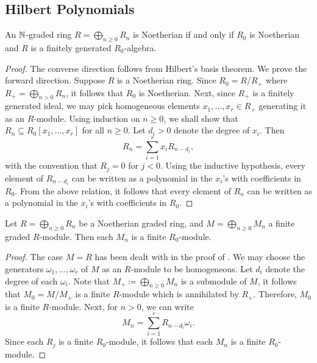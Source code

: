 \subsection{Hilbert Polynomials}

\begin{theorem}
    An $\mathbb{N}$-graded ring $\displaystyle R = \bigoplus_{n\ge 0} R_n$ is Noetherian if and only if $R_0$ is Noetherian and $R$ is a finitely generated $R_0$-algebra.
\end{theorem}
\begin{proof}
    The converse direction follows from Hilbert's basis theorem. We prove the forward direction. Suppose $R$ is a Noetherian ring. Since $R_0 = R/R_+$ where $\displaystyle R_+ = \bigoplus_{n > 0} R_n$, it follows that $R_0$ is Noetherian. Next, since $R_+$ is a finitely generated ideal, we may pick homogeneous elements $x_1,\dots,x_r\in R_+$ generating it as an $R$-module. Using induction on $n\ge 0$, we shall show that $R_n\subseteq R_0[x_1,\dots,x_r]$ for all $n\ge 0$. Let $d_i > 0$ denote the degree of $x_i$. Then
    \begin{equation*}
        R_n = \sum_{i = 1}^r x_i R_{n - d_i},
    \end{equation*}
    with the convention that $R_j = 0$ for $j < 0$. Using the inductive hypothesis, every element of $R_{n - d_i}$ can be written as a polynomial in the $x_i$'s with coefficients in $R_0$. From the above relation, it follows that every element of $R_n$ can be written as a polynomial in the $x_i$'s with coefficients in $R_0$.
\end{proof}

\begin{proposition}
    Let $R = \displaystyle\bigoplus_{n\ge 0} R_n$ be a Noetherian graded ring, and $M = \displaystyle\bigoplus_{n\ge 0} M_n$ a finite graded $R$-module. Then each $M_n$ is a finite $R_0$-module.
\end{proposition}
\begin{proof}
    The case $M = R$ has been dealt with in the proof of . We may choose the generators $\omega_1,\dots,\omega_r$ of $M$ as an $R$-module to be homogeneous. Let $d_i$ denote the degree of each $\omega_i$. Note that $M_+\coloneq\displaystyle\bigoplus_{n\ge 0} M_n$ is a submodule of $M$, it follows that $M_0 = M/M_+$ is a finite $R$-module which is annihilated by $R_+$. Therefore, $M_0$ is a finite $R$-module. Next, for $n > 0$, we can write 
    \begin{equation*}
        M_n = \sum_{i = 1}^r R_{n - d_i}\omega_i.
    \end{equation*}
    Since each $R_j$ is a finite $R_0$-module, it follows that each $M_n$ is a finite $R_0$-module.
\end{proof}

